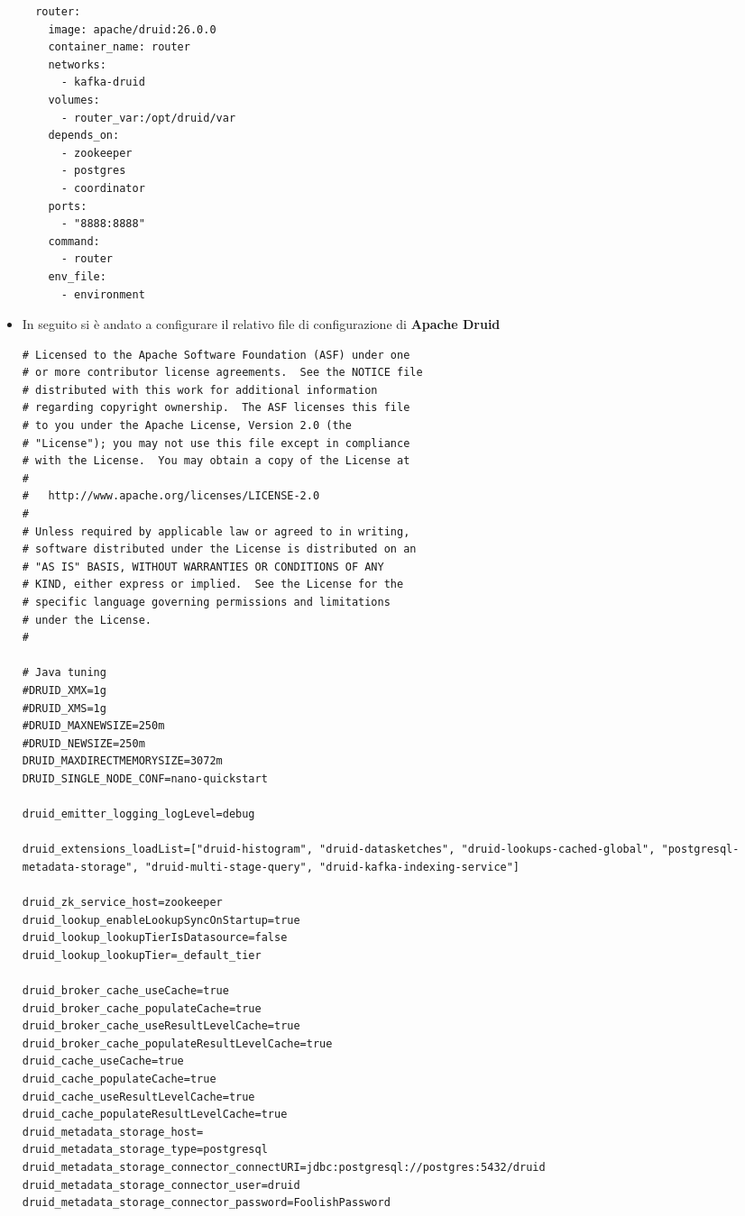 \documentclass{article}
\begin{document}
\begin{itemize}
\begin{lstlisting}
  router:
    image: apache/druid:26.0.0
    container_name: router
    networks:
      - kafka-druid
    volumes:
      - router_var:/opt/druid/var
    depends_on:
      - zookeeper
      - postgres
      - coordinator
    ports:
      - "8888:8888"
    command:
      - router
    env_file:
      - environment
\end{lstlisting}
\item  In seguito si è andato a configurare il relativo file di configurazione di \textbf{Apache Druid}
\begin{lstlisting}
# Licensed to the Apache Software Foundation (ASF) under one
# or more contributor license agreements.  See the NOTICE file
# distributed with this work for additional information
# regarding copyright ownership.  The ASF licenses this file
# to you under the Apache License, Version 2.0 (the
# "License"); you may not use this file except in compliance
# with the License.  You may obtain a copy of the License at
#
#   http://www.apache.org/licenses/LICENSE-2.0
#
# Unless required by applicable law or agreed to in writing,
# software distributed under the License is distributed on an
# "AS IS" BASIS, WITHOUT WARRANTIES OR CONDITIONS OF ANY
# KIND, either express or implied.  See the License for the
# specific language governing permissions and limitations
# under the License.
#

# Java tuning
#DRUID_XMX=1g
#DRUID_XMS=1g
#DRUID_MAXNEWSIZE=250m
#DRUID_NEWSIZE=250m
DRUID_MAXDIRECTMEMORYSIZE=3072m
DRUID_SINGLE_NODE_CONF=nano-quickstart

druid_emitter_logging_logLevel=debug

druid_extensions_loadList=["druid-histogram", "druid-datasketches", "druid-lookups-cached-global", "postgresql-metadata-storage", "druid-multi-stage-query", "druid-kafka-indexing-service"]

druid_zk_service_host=zookeeper
druid_lookup_enableLookupSyncOnStartup=true
druid_lookup_lookupTierIsDatasource=false
druid_lookup_lookupTier=_default_tier

druid_broker_cache_useCache=true
druid_broker_cache_populateCache=true
druid_broker_cache_useResultLevelCache=true
druid_broker_cache_populateResultLevelCache=true
druid_cache_useCache=true
druid_cache_populateCache=true
druid_cache_useResultLevelCache=true
druid_cache_populateResultLevelCache=true
druid_metadata_storage_host=
druid_metadata_storage_type=postgresql
druid_metadata_storage_connector_connectURI=jdbc:postgresql://postgres:5432/druid
druid_metadata_storage_connector_user=druid
druid_metadata_storage_connector_password=FoolishPassword


\end{lstlisting}
\end{itemize}
\end{document}
